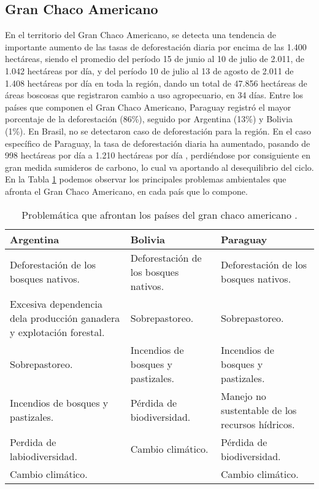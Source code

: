\subsection{Gran Chaco Americano}
En el territorio del Gran Chaco Americano, se detecta una tendencia de importante aumento de las tasas de deforestaci\'on diaria por encima de las 1.400 hect\'areas, siendo el promedio del per\'iodo 15 de junio al 10 de julio de 2.011, de 1.042 hect\'areas por d\'ia, y del per\'iodo 10 de julio al 13 de agosto de 2.011 de 1.408 hect\'areas por d\'ia en toda la regi\'on, dando un total de 47.856 hect\'areas de \'areas boscosas que registraron cambio a uso agropecuario, en 34 d\'ias. Entre los pa\'ises que componen el Gran Chaco Americano,  Paraguay  registr\'o el mayor porcentaje de la deforestaci\'on (86\%), seguido por Argentina (13\%) y Bolivia (1\%). En Brasil, no se detectaron caso de deforestaci\'on para la regi\'on. En el caso espec\'ifico de Paraguay, la tasa de deforestaci\'on diaria ha aumentado, pasando de 998 hect\'areas por d\'ia a 1.210 hect\'areas por d\'ia \cite{fao2003revista}, perdi\'endose por consiguiente en gran medida sumideros de carbono, lo cual va aportando al desequilibrio del ciclo. En la Tabla \ref{tab:chacoamericano} podemos observar los principales problemas ambientales que afronta el Gran Chaco Americano, en cada pa\'is que lo compone.
\begin{table}[!hbtp]
	\centering
	\caption{Problem\'atica que afrontan los pa\'ises del gran chaco americano \cite{gustavo2012deteccion}.}
	\label{tab:chacoamericano}
	\begin{tabular}{|p{4cm}|p{4cm}|p{4cm}|}
		\hline
		{\bf Argentina} & {\bf Bolivia} & {\bf Paraguay} \\ \hline
		Deforestaci\'on de los bosques nativos. & Deforestaci\'on de los bosques nativos. & Deforestaci\'on de los bosques nativos. \\ \hline
		Excesiva dependencia dela producci\'on ganadera y explotaci\'on forestal. & Sobrepastoreo. & Sobrepastoreo. \\ \hline
		Sobrepastoreo. & Incendios de bosques y pastizales. & Incendios de bosques y pastizales. \\ \hline
		Incendios de bosques y pastizales. & P\'erdida de biodiversidad. & Manejo no sustentable de los recursos h\'idricos. \\ \hline
		Perdida de labiodiversidad. & Cambio clim\'atico. & P\'erdida de biodiversidad. \\ \hline
		Cambio clim\'atico. &  & Cambio clim\'atico. \\ \hline
	\end{tabular}
\end{table}


